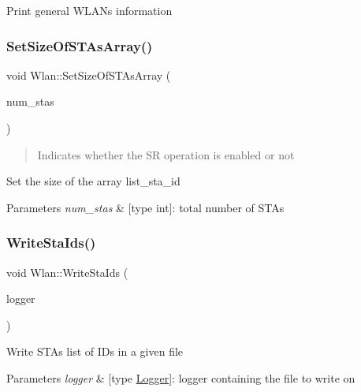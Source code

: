 Print general W\+L\+AN\textquotesingle{}s information \mbox{\label{structWlan_a2e8b797ec5404eb24afef8e61ac5ab12}} 
\subsubsection{\texorpdfstring{Set\+Size\+Of\+S\+T\+As\+Array()}{SetSizeOfSTAsArray()}}
{\footnotesize\ttfamily void Wlan\+::\+Set\+Size\+Of\+S\+T\+As\+Array (\begin{DoxyParamCaption}\item[{int}]{num\+\_\+stas }\end{DoxyParamCaption})\hspace{0.3cm}{\ttfamily [inline]}}



\begin{quote}
Indicates whether the SR operation is enabled or not \end{quote}


Set the size of the array list\+\_\+sta\+\_\+id 
\begin{DoxyParams}{Parameters}
{\em num\+\_\+stas} & \mbox{[}type int\mbox{]}\+: total number of S\+T\+As \\
\hline
\end{DoxyParams}
\mbox{\label{structWlan_ab61a4af9882ac2df280ac073f6164521}} 
\subsubsection{\texorpdfstring{Write\+Sta\+Ids()}{WriteStaIds()}}
{\footnotesize\ttfamily void Wlan\+::\+Write\+Sta\+Ids (\begin{DoxyParamCaption}\item[{\hyperlink{structLogger}{Logger}}]{logger }\end{DoxyParamCaption})\hspace{0.3cm}{\ttfamily [inline]}}

Write S\+T\+As list of I\+Ds in a given file 
\begin{DoxyParams}{Parameters}
{\em logger} & \mbox{[}type \hyperlink{structLogger}{Logger}\mbox{]}\+: logger containing the file to write on \\
\hline
\end{DoxyParams}
\mbox{\label{structWlan_a8a999685a03c0c478ae95b9dfb98dd01}} 
